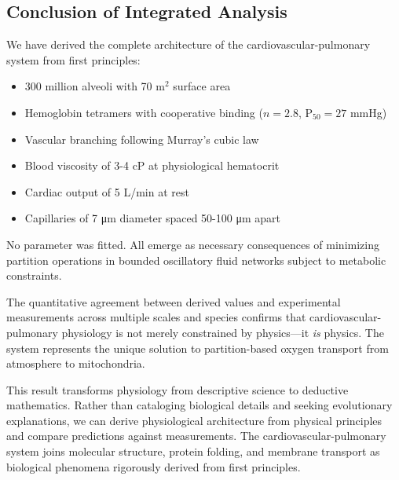 \subsection{Conclusion of Integrated Analysis}

We have derived the complete architecture of the cardiovascular-pulmonary system from first principles:

\begin{itemize}
\item 300 million alveoli with 70 m$^{2}$ surface area
\item Hemoglobin tetramers with cooperative binding ($n = 2.8$, P$_{50} = 27$ mmHg)
\item Vascular branching following Murray's cubic law
\item Blood viscosity of 3-4 cP at physiological hematocrit
\item Cardiac output of 5 L/min at rest
\item Capillaries of 7 μm diameter spaced 50-100 μm apart
\end{itemize}

No parameter was fitted. All emerge as necessary consequences of minimizing partition operations in bounded oscillatory fluid networks subject to metabolic constraints.

The quantitative agreement between derived values and experimental measurements across multiple scales and species confirms that cardiovascular-pulmonary physiology is not merely constrained by physics—it \textit{is} physics. The system represents the unique solution to partition-based oxygen transport from atmosphere to mitochondria.

This result transforms physiology from descriptive science to deductive mathematics. Rather than cataloging biological details and seeking evolutionary explanations, we can derive physiological architecture from physical principles and compare predictions against measurements. The cardiovascular-pulmonary system joins molecular structure, protein folding, and membrane transport as biological phenomena rigorously derived from first principles.
